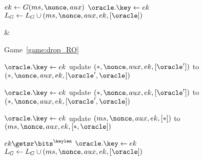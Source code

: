 \begin{figure}
\begin{leftfullpage}
\begin{adjustbox}{tabular={cc},Trim=0.9ex 0 0 0, width=\textwidth}
\begin{adjustbox}{minipage=[t][]{\codewidth},fbox}
\begin{algorithmic}[1]
			\color{black}
			
			\Else 
				\State {}
				\State $ek \gets G(ms, \nonce, aux)$
				\State $\oracle.\key \gets ek$
				\State $L_G \gets L_G \cup (ms, \nonce, aux, ek, [\oracle]) $
			\EndIf
			
		\end{algorithmic}
	\end{adjustbox}

	&
	
	
	\begin{adjustbox}{minipage=[t][]{\codewidth},fbox}
		\begin{algorithmic}[1]	
		
			\State {}
			\Comment Game~\ref{game:drop_RO}
			
				\State $\oracle.\key \gets ek$
				\State update $(*, \nonce, aux, ek, [\oracle'])$ to $(*, \nonce, aux, ek, [\oracle', \oracle])$
		
			\color{black}
		
			
			\State \hspace*{-\algorithmicindent} 
				\State $\oracle.\key \gets ek$
				\State update $(*, \nonce, aux, ek, [\oracle'])$ to $(*, \nonce, aux, ek, [\oracle', \oracle])$
			
			\color{black}
		
			\State \hspace*{-\algorithmicindent} 
				\State $\oracle.\key \gets ek$
				\State update $(ms, \nonce, aux, ek, [*])$ to $(ms, \nonce, aux, ek, [*,\oracle])$ \label{alg:line:send_game_hops:drop_RO:look_at_MS}
			
			\color{black}
			
			\Else
				\State {}
				\color{black}
				\State $ek \getsr \bits^\keylen$
				\color{black}
				\State $\oracle.\key \gets ek$
				\State $L_G \gets L_G \cup  (ms, \nonce, aux, ek, [\oracle]) $
			\EndIf
			

\end{algorithmic}
\end{adjustbox}
\end{adjustbox}
\end{leftfullpage}
\end{figure}
